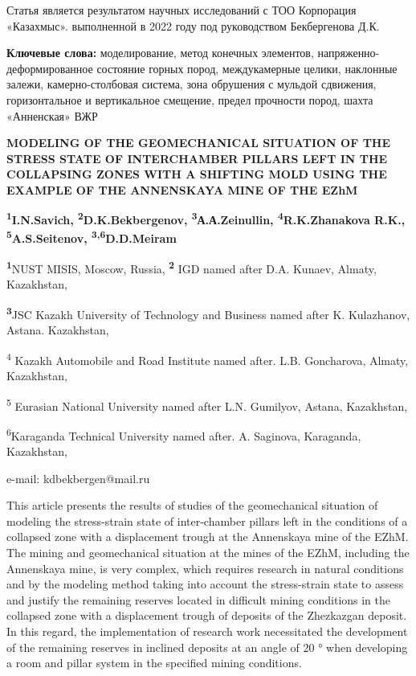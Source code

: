 Статья является результатом научных исследований с ТОО Корпорация
«Казахмыс». выполненной в 2022 году под руководством Бекбергенова Д.К.

{\bfseries Ключевые слова:} моделирование, метод конечных элементов,
напряженно-деформированное состояние горных пород, междукамерные целики,
наклонные залежи, камерно-столбовая система, зона обрушения с мульдой
сдвижения, горизонтальное и вертикальное смещение, предел прочности
пород, шахта «Анненская» ВЖР

\begin{articleheader}

{\bfseries MODELING OF THE GEOMECHANICAL SITUATION OF THE STRESS STATE OF
INTERCHAMBER PILLARS LEFT IN THE COLLAPSING ZONES WITH A SHIFTING MOLD USING THE EXAMPLE OF THE ANNENSKAYA MINE OF THE EZhM}

{\bfseries \textsuperscript{1}I.N.Savich,
\textsuperscript{2}D.K.Bekbergenov\textsuperscript{\envelope },
\textsuperscript{3}А.А.Zeinullin, \textsuperscript{4}R.K.Zhanakova R.K.,
\textsuperscript{5}A.S.Seitenov, \textsuperscript{3,6}D.D.Meiram}
\end{articleheader}
\begin{affiliation}

{\bfseries \textsuperscript{1}}NUST MISIS, Moscow, Russia,
{\bfseries \textsuperscript{2}} IGD named after D.A. Kunaev, Almaty,
Kazakhstan,

{\bfseries \textsuperscript{3}}JSC Kazakh University of Technology and
Business named after K. Kulazhanov, Astana. Kazakhstan,

\textsuperscript{4} Kazakh Automobile and Road Institute named after.
L.B. Goncharova, Almaty, Kazakhstan,

\textsuperscript{5} Eurasian National University named after L.N.
Gumilyov, Astana, Kazakhstan,

\textsuperscript{6}Karaganda Technical University named after. A.
Saginova, Karaganda, Kazakhstan,

e-mail: kdbekbergen@mail.ru
\end{affiliation}

This article presents the results of studies of the geomechanical
situation of modeling the stress-strain state of inter-chamber pillars
left in the conditions of a collapsed zone with a displacement trough at
the Annenskaya mine of the EZhM. The mining and geomechanical situation
at the mines of the EZhM, including the Annenskaya mine, is very
complex, which requires research in natural conditions and by the
modeling method taking into account the stress-strain state to assess
and justify the remaining reserves located in difficult mining
conditions in the collapsed zone with a displacement trough of deposits
of the Zhezkazgan deposit. In this regard, the implementation of
research work necessitated the development of the remaining reserves in
inclined deposits at an angle of 20 ° when developing a room and pillar
system in the specified mining conditions.

